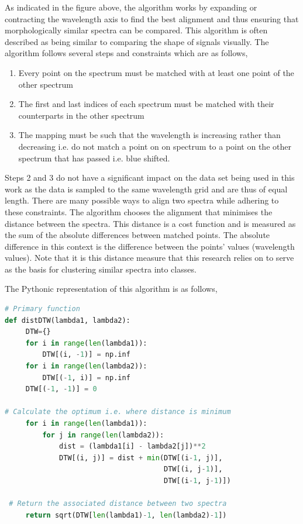 As indicated in the figure above, the algorithm works by expanding or contracting the wavelength axis to find the best alignment and thus ensuring that morphologically similar spectra can be compared. This algorithm is often described as being similar to comparing the shape of signals visually. The algorithm follows several steps and constraints which are as follows,

\begin{enumerate}
    \item Every point on the spectrum must be matched with at least one point of the other spectrum
    \item The first and last indices of each spectrum must be matched with their counterparts in the other spectrum
    \item The mapping must be such that the wavelength is increasing rather than decreasing i.e. do not match a point on on spectrum to a point on the other spectrum that has passed i.e. blue shifted. 
\end{enumerate}

Steps 2 and 3 do not have a significant impact on the data set being used in this work as the data is sampled to the same wavelength grid and are thus of equal length. There are many possible ways to align two spectra while adhering to these constraints. The algorithm chooses the alignment that minimises the distance between the spectra. This distance is a cost function and is measured as the sum of the absolute differences between matched points. The absolute difference in this context is the difference between the points' values (wavelength values). Note that it is this distance measure that this research relies on to serve as the basis for clustering similar spectra into classes.


The Pythonic representation of this algorithm is as follows,

\begin{lstlisting}[language=Python]
# Primary function
def distDTW(lambda1, lambda2):
     DTW={}
     for i in range(len(lambda1)):
         DTW[(i, -1)] = np.inf
     for i in range(len(lambda2)):
         DTW[(-1, i)] = np.inf
     DTW[(-1, -1)] = 0
 
# Calculate the optimum i.e. where distance is minimum
     for i in range(len(lambda1)):
         for j in range(len(lambda2)):
             dist = (lambda1[i] - lambda2[j])**2
             DTW[(i, j)] = dist + min(DTW[(i-1, j)],
                                      DTW[(i, j-1)], 
                                      DTW[(i-1, j-1)])
 
 # Return the associated distance between two spectra
     return sqrt(DTW[len(lambda1)-1, len(lambda2)-1])
\end{lstlisting}

